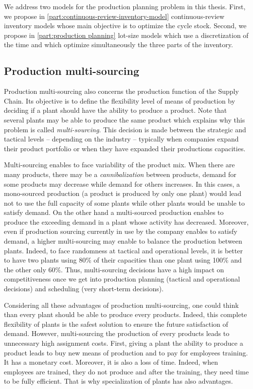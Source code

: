 \medskip


We address two models for the production planning problem in this thesis.
First, we propose in \cref{part:continuous-review-inventory-model} continuous-review inventory models whose main objective is to optimize the cycle stock.
Second, we propose in \cref{part:production planning} lot-size models which use a discretization of the time and which optimize simultaneously the three parts of the inventory.


\subsection{Production multi-sourcing}
\label{sec:business-context:argon:multi-sourcing}


Production multi-sourcing also concerns the production function of the Supply Chain.
Its objective is to define the flexibility level of means of production by deciding if a plant should have the ability to produce a product.
Note that several plants may be able to produce the same product which explains why this problem is called \emph{multi-sourcing}.
This decision is made between the strategic and tactical levels -- depending on the industry -- typically when companies expand their product portfolio or when they have expanded their productions capacities.


Multi-sourcing enables to face variability of the product mix.
When there are many products, there may be a \emph{cannibalization} between products, \ie demand for some products may decrease while demand for others increases.
In this cases, a mono-sourced production (\ie a product is produced by only one plant) would lead not to use the full capacity of some plants while other plants would be unable to satisfy demand.
On the other hand a multi-sourced production enables to produce the exceeding demand in a plant whose activity has decreased.
Moreover, even if production sourcing currently in use by the company enables to satisfy demand, a higher multi-sourcing may enable to balance the production between plants.
Indeed, to face randomness at tactical and operational levels, it is better to have two plants using 80\% of their capacities than one plant using 100\% and the other only 60\%. 
Thus, multi-sourcing decisions have a high impact on competitiveness once we get into production planning (tactical and operational decisions) and scheduling (very short-term decisions).


Considering all these advantages of production multi-sourcing, one could think than every plant should be able to produce every products.
Indeed, this complete flexibility of plants is the safest solution to ensure the future satisfaction of demand.
However, multi-sourcing the production of every products leads to unnecessary high assignment costs.
First, giving a plant the ability to produce a product leads to buy new means of production and to pay for employees training.
It has a monetary cost.
Moreover, it is also a loss of time.
Indeed, when employees are trained, they do not produce and after the training, they need time to be fully efficient.
That is why specialization of plants has also advantages.


